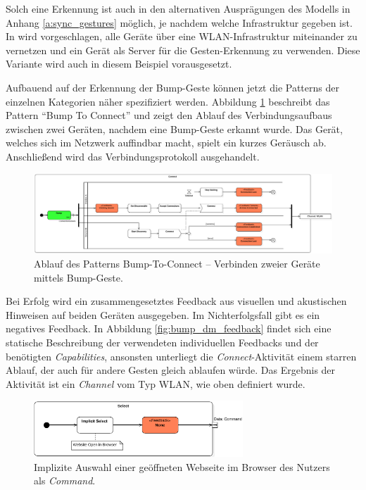 Solch eine Erkennung ist auch in den alternativen Ausprägungen des Modells in Anhang \ref{a:sync_gestures} möglich, je nachdem welche Infrastruktur gegeben ist. In \citep{Hinckley2003} wird vorgeschlagen, alle Geräte über eine WLAN-Infrastruktur miteinander zu vernetzen und ein Gerät als Server für die Gesten-Erkennung zu verwenden. Diese Variante wird auch in diesem Beispiel vorausgesetzt.

Aufbauend auf der Erkennung der Bump-Geste können jetzt die Patterns der einzelnen Kategorien näher spezifiziert werden. Abbildung \ref{fig:bump_connect} beschreibt das Pattern "`Bump To Connect"' und zeigt den Ablauf des Verbindungsaufbaus zwischen zwei Geräten, nachdem eine Bump-Geste erkannt wurde. Das Gerät, welches sich im Netzwerk auffindbar macht, spielt ein kurzes Geräusch ab. Anschließend wird das Verbindungsprotokoll ausgehandelt. 

\begin{figure}
\centering
\includegraphics[width=1\textwidth]{bilder/bump/connect}
\caption{Ablauf des Patterns Bump-To-Connect -- Verbinden zweier Geräte mittels Bump-Geste.}
\label{fig:bump_connect}
\end{figure}

Bei Erfolg wird ein zusammengesetztes Feedback aus visuellen und akustischen Hinweisen auf beiden Geräten ausgegeben. Im Nichterfolgsfall gibt es ein negatives Feedback. In Abbildung \ref{fig:bump_dm_feedback} findet sich eine statische Beschreibung der verwendeten individuellen Feedbacks und der benötigten \textit{Capabilities}, ansonsten unterliegt die \textit{Connect}-Aktivität einem starren Ablauf, der auch für andere Gesten gleich ablaufen würde. Das Ergebnis der Aktivität ist ein \textit{Channel} vom Typ WLAN, wie oben definiert wurde.

\begin{figure}[h]
\centering
\includegraphics[page=1,width=0.7\textwidth]{bilder/bump/select}
\caption{Implizite Auswahl einer geöffneten Webseite im Browser des Nutzers als \textit{Command}.}
\label{fig:bump_command_select}
\end{figure}

